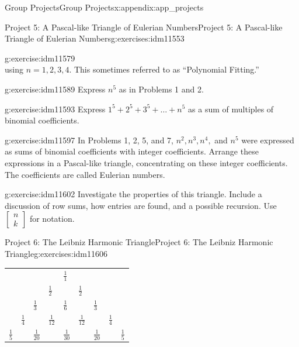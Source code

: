 \documentclass[oneside,10pt,]{book}
\numberwithin{equation}{chapter}
\begin{document}
\begin{appendixptx}{Group Projects}{}{Group Projects}{}{}{x:appendix:app_projects}
\begin{exercises-section-numberless}{Project 5: A Pascal-like Triangle of Eulerian Numbers}{}{Project 5: A Pascal-like Triangle of Eulerian Numbers}{}{}{g:exercises:idm11553}
\begin{divisionexercise}{7}{}{}{g:exercise:idm11579}
\begin{equation*}
\end{equation*}
using \(n=1, 2, 3, 4\). This sometimes referred to as ``Polynomial Fitting.''%
\end{divisionexercise}%
\begin{divisionexercise}{8}{}{}{g:exercise:idm11589}%
Express \(n^{5}\) as in Problems 1 and 2.%
\end{divisionexercise}%
\begin{divisionexercise}{9}{}{}{g:exercise:idm11593}%
Express \(1^{5} + 2^{5} + 3^{5} + \ldots + n^{5}\) as a sum of multiples of binomial coefficients.%
\end{divisionexercise}%
\begin{divisionexercise}{10}{}{}{g:exercise:idm11597}%
In Problems 1, 2, 5, and 7, \(n^{2},n^{3},n^{4},\) and \(n^{5}\) were expressed as sums of binomial coefficients with integer coefficients. Arrange these expressions in a Pascal-like triangle, concentrating on these integer coefficients. The coefficients are called Eulerian numbers.%
\end{divisionexercise}%
\begin{divisionexercise}{11}{}{}{g:exercise:idm11602}%
Investigate the properties of this triangle. Include a discussion of row sums, how entries are found, and a possible recursion. Use \(\begin{bmatrix}
n\\
k
\end{bmatrix}\) for notation.%
\end{divisionexercise}%
\end{exercises-section-numberless}
%
%
\typeout{************************************************}
\typeout{************************************************}
%
\begin{exercises-section-numberless}{Project 6: The Leibniz Harmonic Triangle}{}{Project 6: The Leibniz Harmonic Triangle}{}{}{g:exercises:idm11606}
\begin{sidebyside}{1}{0}{0}{0}%
\begin{sbspanel}{1}%
{\centering%
\begin{tabular}{lllllllll}
&&&&\(\frac{1}{1}\)&&&&\tabularnewline[0pt]
&&&\(\frac{1}{2}\)&&\(\frac{1}{2}\)&&&\tabularnewline[0pt]
&&\(\frac{1}{3}\)&&\(\frac{1}{6}\)&&\(\frac{1}{3}\)&&\tabularnewline[0pt]
&\(\frac{1}{4}\)&&\(\frac{1}{12}\)&&\(\frac{1}{12}\)&&\(\frac{1}{4}\)&\tabularnewline[0pt]
\(\frac{1}{5}\)&&\(\frac{1}{20}\)&&\(\frac{1}{30}\)&&\(\frac{1}{20}\)&&\(\frac{1}{5}\)
\end{tabular}
}
\end{sbspanel}
\end{sidebyside}
\end{exercises-section-numberless}
\end{appendixptx}
\end{document}
